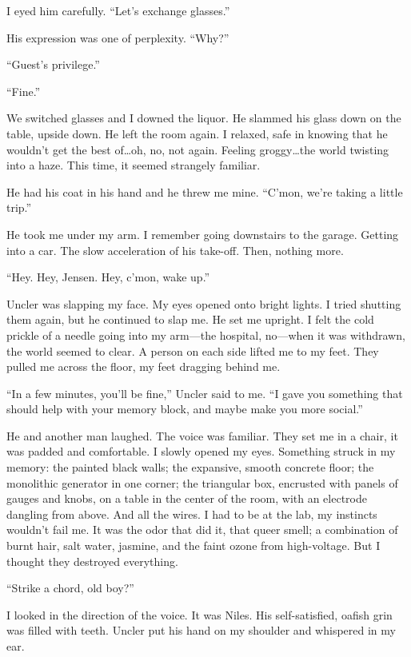 I eyed him carefully. ``Let's exchange glasses.''

His expression was one of perplexity. ``Why?''

``Guest's privilege.''

``Fine.''

We switched glasses and I downed the liquor. He slammed his glass down
on the table, upside down. He left the room again. I relaxed, safe in
knowing that he wouldn't get the best of\ldots oh, no, not again.
Feeling groggy\ldots the world twisting into a haze. This time, it
seemed strangely familiar.

He had his coat in his hand and he threw me mine. ``C'mon, we're taking
a little trip.''

He took me under my arm. I remember going downstairs to the garage.
Getting into a car. The slow acceleration of his take-off. Then, nothing
more.

``Hey. Hey, Jensen. Hey, c'mon, wake up.''

Uncler was slapping my face. My eyes opened onto bright lights. I tried
shutting them again, but he continued to slap me. He set me upright. I
felt the cold prickle of a needle going into my arm---the hospital,
no---when it was withdrawn, the world seemed to clear. A person on each
side lifted me to my feet. They pulled me across the floor, my feet
dragging behind me.

``In a few minutes, you'll be fine,'' Uncler said to me. ``I gave you
something that should help with your memory block, and maybe make you
more social.''

He and another man laughed. The voice was familiar. They set me in a
chair, it was padded and comfortable. I slowly opened my eyes. Something
struck in my memory: the painted black walls; the expansive, smooth
concrete floor; the monolithic generator in one corner; the triangular
box, encrusted with panels of gauges and knobs, on a table in the center
of the room, with an electrode dangling from above. And all the wires. I
had to be at the lab, my instincts wouldn't fail me. It was the odor
that did it, that queer smell; a combination of burnt hair, salt water,
jasmine, and the faint ozone from high-voltage. But I thought they
destroyed everything.

``Strike a chord, old boy?''

I looked in the direction of the voice. It was Niles. His
self-satisfied, oafish grin was filled with teeth. Uncler put his hand
on my shoulder and whispered in my ear.


